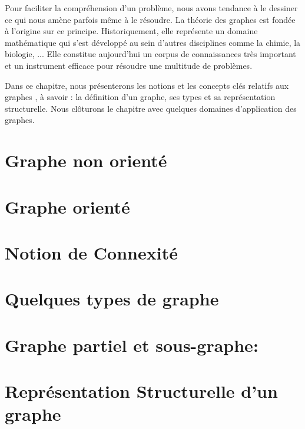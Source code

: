 Pour faciliter la compréhension d'un problème, nous avons tendance à le dessiner ce qui nous amène parfois même à le résoudre. La théorie des graphes est fondée à l'origine sur ce principe.  Historiquement, elle représente un domaine mathématique qui s'est développé  au sein d'autres disciplines comme la chimie, la biologie, ... Elle constitue aujourd'hui un corpus de connaissances très important et un instrument efficace pour résoudre une multitude de problèmes.

Dans ce chapitre, nous présenterons les notions et les concepts clés relatifs aux graphes , à savoir : la définition d'un graphe, ses types et sa représentation structurelle. Nous clôturons le chapitre avec quelques domaines d'application des graphes.

	
	\section{Graphe non orienté}
		
			
	\section{Graphe orienté}	
		
		
	\section{Notion de Connexité}
	
	
	
	\section{Quelques types de graphe}
		
	
	\section{Graphe partiel et sous-graphe:}
    				
	
		
	
	
    		
    	\section{Représentation Structurelle d'un graphe}	
		
	
